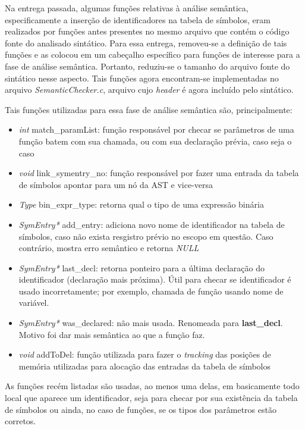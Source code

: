\documentclass[
	article,			%
	11pt,				%
	oneside,			%
	a4paper,			%
	english,			%
	brazil,				%
	sumario=tradicional
	]{abntex2}
\renewcommand{\it}[1]{\textit{#1}}
\renewcommand{\bf}[1]{\textbf{#1}}
\begin{document}
Na entrega passada, algumas funções relativas à análise semântica, especificamente a inserção de identificadores na tabela de símbolos, eram realizados por funções antes presentes no mesmo arquivo que contém o código fonte do analisado sintático. Para essa entrega, removeu-se a definição de tais funções e as colocou em um cabeçalho específico para funções de interesse para a fase de análise semântica. Portanto, reduziu-se o tamanho do arquivo fonte do sintático nesse aspecto. Tais funções agora encontram-se implementadas no arquivo \it{SemanticChecker.c}, arquivo cujo \it{header }é agora incluído pelo sintático.

Tais funções utilizadas para essa fase de análise semântica são, principalmente:

\begin{itemize}
	\item \it{int} match\_paramList: função responsável por checar se parâmetros de uma função batem com sua chamada, ou com sua declaração prévia, caso seja o caso
	\item \it{void} link\_symentry\_no: função responsável por fazer uma entrada da tabela de símbolos apontar para um nó da AST e vice-versa
	\item \it{Type} bin\_expr\_type: retorna qual o tipo de uma expressão binária
	\item \it{SymEntry*} add\_entry: adiciona novo nome de identificador na tabela de símbolos, caso não exista resgistro prévio no escopo em questão. Caso contrário, mostra erro semântico e retorna \it{NULL}
	\item \it{SymEntry*} last\_decl: retorna ponteiro para a última declaração do identificador (declaração mais próxima). Útil para checar se identificador é usado incorretamente; por exemplo, chamada de função usando nome de variável.
  \item	\it{SymEntry*} was\_declared: não mais usada. Renomeada para \bf{last\_decl}. Motivo foi dar mais semântica ao que a função faz.
	\item \it{void} addToDel: função utilizada para fazer o \it{tracking} das posições de memória utilizadas para alocação das entradas da tabela de símbolos
\end{itemize}

As funções recém listadas são usadas, ao menos uma delas, em basicamente todo local que aparece um identificador, seja para checar por sua existência da tabela de símbolos ou ainda, no caso de funções, se os tipos dos parâmetros estão corretos.
\end{document}

